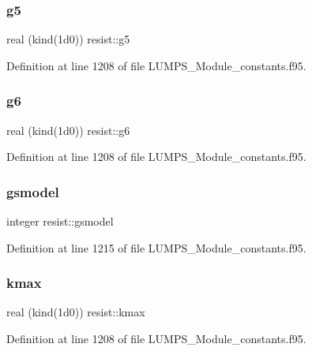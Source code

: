 \subsubsection{\texorpdfstring{g5}{g5}}
{\footnotesize\ttfamily real (kind(1d0)) resist\+::g5}



Definition at line 1208 of file L\+U\+M\+P\+S\+\_\+\+Module\+\_\+constants.\+f95.

\mbox{\label{namespaceresist_a7ad9926600ac79377439521a837b21de}} 
\subsubsection{\texorpdfstring{g6}{g6}}
{\footnotesize\ttfamily real (kind(1d0)) resist\+::g6}



Definition at line 1208 of file L\+U\+M\+P\+S\+\_\+\+Module\+\_\+constants.\+f95.

\mbox{\label{namespaceresist_a89895984ab23ef2627cb851eadd8b858}} 
\subsubsection{\texorpdfstring{gsmodel}{gsmodel}}
{\footnotesize\ttfamily integer resist\+::gsmodel}



Definition at line 1215 of file L\+U\+M\+P\+S\+\_\+\+Module\+\_\+constants.\+f95.

\mbox{\label{namespaceresist_ab582d1ab5eac071afaba0e8b351311ff}} 
\subsubsection{\texorpdfstring{kmax}{kmax}}
{\footnotesize\ttfamily real (kind(1d0)) resist\+::kmax}



Definition at line 1208 of file L\+U\+M\+P\+S\+\_\+\+Module\+\_\+constants.\+f95.

\mbox{\label{namespaceresist_a8ce25344e41b31f4da68572adc0b8391}} 
